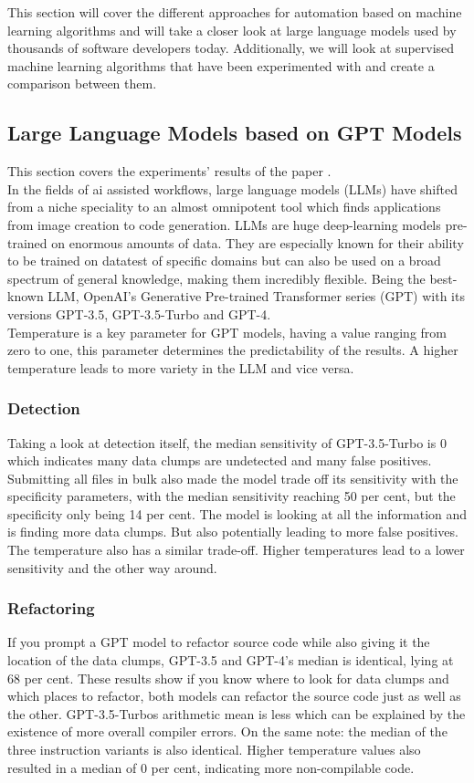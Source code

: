 This section will cover the different approaches for automation based on machine learning algorithms and will take a closer look at large language models used by thousands of software developers today. Additionally, we will look at supervised machine learning algorithms that have been experimented with and create a comparison between them.
\subsection{Large Language Models based on GPT Models}
This section covers the experiments' results of the paper \cite[AI-Driven Refactoring: A Pipeline for Identifying and Correcting Data Clumps in Git Repositories]{baumgartner2024aidriven}.\\
In the fields of ai assisted workflows, large language models (LLMs) have shifted from a niche speciality to an almost omnipotent tool which finds applications from image creation to code generation.\cite{meyer2024ai} LLMs are huge deep-learning models pre-trained on enormous amounts of data. They are especially known for their ability to be trained on datatest of specific domains but can also be used on a broad spectrum of general knowledge, making them incredibly flexible. \cite{baumgartner2024aidriven}
Being the best-known LLM, OpenAI's Generative Pre-trained Transformer series (GPT) with its versions GPT-3.5, GPT-3.5-Turbo and GPT-4.\\
Temperature is a key parameter for GPT models, having a value ranging from zero to one, this parameter determines the predictability of the results.
A higher temperature leads to more variety in the LLM and vice versa.
\subsubsection{Detection}
Taking a look at detection itself, the median sensitivity of GPT-3.5-Turbo is 0 which indicates many data clumps are undetected and many false positives.
Submitting all files in bulk also made the model trade off its sensitivity with the specificity parameters, with the median sensitivity reaching 50 per cent, but the specificity only being 14 per cent. 
The model is looking at all the information and is finding more data clumps. But also potentially leading to more false positives.
The temperature also has a similar trade-off. Higher temperatures lead to a lower sensitivity and the other way around.
\subsubsection{Refactoring}
If you prompt a GPT model to refactor source code while also giving it the location of the data clumps, GPT-3.5 and GPT-4's median is identical, lying at 68 per cent.
These results show if you know where to look for data clumps and which places to refactor, both models can refactor the source code just as well as the other.
GPT-3.5-Turbos arithmetic mean is less which can be explained by the existence of more overall compiler errors.
On the same note: the median of the three instruction variants is also identical.
Higher temperature values also resulted in a median of 0 per cent, indicating more non-compilable code.
